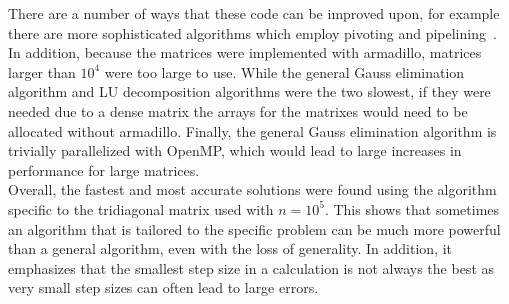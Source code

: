 \documentclass[prc,amsmath,twocolumn,superscriptaddress]{revtex4}
\begin{document}
There are a number of ways that these code can be improved upon, for example there are more sophisticated algorithms which employ pivoting and pipelining~\cite{other_gauss,gauss_other2}. In addition, because the matrices were implemented with armadillo, matrices larger than $10^4$ were too large to use. While the general Gauss elimination algorithm and LU decomposition algorithms were the two slowest, if they were needed due to a dense matrix the arrays for the matrixes would need to be allocated without armadillo. Finally, the general Gauss elimination algorithm is trivially parallelized with OpenMP, which would lead to large increases in performance for large matrices. \\

Overall, the fastest and most accurate solutions were found using the algorithm specific to the tridiagonal matrix used with $n=10^5$. This shows that sometimes an algorithm that is tailored to the specific problem can be much more powerful than a general algorithm, even with the loss of generality. In addition, it emphasizes that the smallest step size in a calculation is not always the best as very small step sizes can often lead to large errors.


\end{document}

